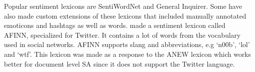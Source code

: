 Popular sentiment lexicons are SentiWordNet and General Inquirer. Some have also made custom extensions of these lexicons that included manually annotated emoticons and hashtags as well as words. \cite{article:afinn} made a sentiment lexicon called AFINN, specialized for Twitter. It contains a lot of words from the vocabulary used in social networks. AFINN supports slang and abbreviations, e.g ‘n00b’, ‘lol’ and ‘wtf’. This lexicon was made as a response to the ANEW lexicon which works better for document level SA since it does not support the Twitter language.